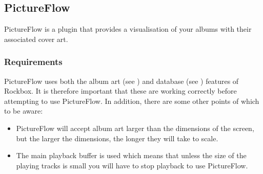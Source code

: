 \subsection{PictureFlow}
PictureFlow is a plugin that provides a visualisation of your albums with
their associated cover art.

\subsubsection{Requirements}
PictureFlow uses both the album art (see ) and 
database (see ) features of Rockbox.
It is therefore important that these are working correctly before attempting
to use PictureFlow. In addition, there are some other points of which to be
aware:

  \begin{itemize}
    \item PictureFlow will accept album art larger than the dimensions of the
    screen, but the larger the dimensions, the longer they will take to scale.
    \item The main playback buffer is used which means that unless the size of the
    playing tracks is small you will have to stop playback to use PictureFlow.
  \end{itemize}


